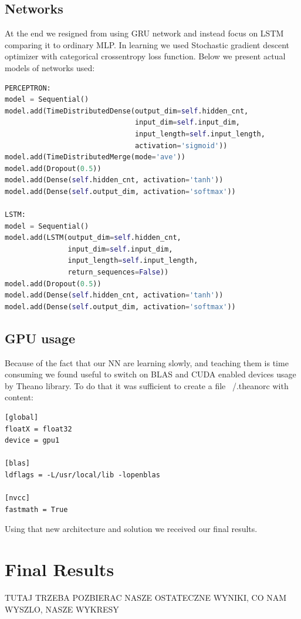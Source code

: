 \documentclass[twoside]{article}
\begin{document}
\begin{multicols}{2}
\subsection{Networks}
At the end we resigned from using GRU network and instead focus on LSTM comparing it to ordinary MLP.
In learning we used Stochastic gradient descent optimizer with categorical crossentropy loss function.
Below we present actual models of networks used:
\begin{lstlisting}[language=Python, frame=single, basicstyle=\tiny]
PERCEPTRON:
model = Sequential()
model.add(TimeDistributedDense(output_dim=self.hidden_cnt,
                               input_dim=self.input_dim,
                               input_length=self.input_length,
                               activation='sigmoid'))
model.add(TimeDistributedMerge(mode='ave'))
model.add(Dropout(0.5))
model.add(Dense(self.hidden_cnt, activation='tanh'))
model.add(Dense(self.output_dim, activation='softmax'))

LSTM:
model = Sequential()
model.add(LSTM(output_dim=self.hidden_cnt,
			   input_dim=self.input_dim,
			   input_length=self.input_length,
			   return_sequences=False))
model.add(Dropout(0.5))
model.add(Dense(self.hidden_cnt, activation='tanh'))
model.add(Dense(self.output_dim, activation='softmax'))
\end{lstlisting}

\subsection{GPU usage}
Because of the fact that our NN are learning slowly, and teaching them is time consuming we found
useful to switch on BLAS and CUDA enabled devices usage by Theano library. To do that it was sufficient to
create a file ~/.theanorc with content: \\
\begin{lstlisting}
[global]
floatX = float32
device = gpu1

[blas]
ldflags = -L/usr/local/lib -lopenblas

[nvcc]
fastmath = True
\end{lstlisting}

Using that new architecture and solution we received our final results.

\section{Final Results}

TUTAJ TRZEBA POZBIERAC NASZE OSTATECZNE WYNIKI, CO NAM WYSZLO, NASZE WYKRESY


\end{multicols}
\end{document}
